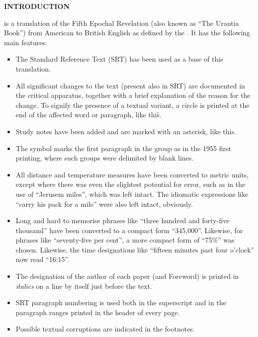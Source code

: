 \thispagestyle{empty}

\makeatletter
{}%
\makeatother

\begin{center}
\LARGE\bfseries
INTRODUCTION
\end{center}


 is a translation of the Fifth Epochal Revelation (also known as ``The Urantia Book'')
from American to British English as defined by the .
It has the following main features:

\begin{itemize}
\item The Standard Reference Text (SRT) has been used as a base of this translation.
\item All significant changes to the text (present also in SRT) are documented in the critical apparatus, together with a brief explanation of the reason for the change. To signify the presence of a textual variant, a circle is printed at the end of the affected word or paragraph, like this\r{}.
\item Study notes have been added and are marked with an asterisk, like this\ts{*}.
\item The symbol \pc{} marks the first paragraph in the group as in the 1955 first printing, where such groups were delimited by blank lines.
\item All distance and temperature measures have been converted to metric units, except where there was even the slightest potential for error, such as in the use of ``Jerusem miles'', which was left intact. The idiomatic expressions like ``carry his pack for a mile'' were also left intact, obviously.
\item Long and hard to memorise phrases like ``three hundred and forty\hyp{}five thousand'' have been converted to a compact form ``345,000''. Likewise, for phrases like ``seventy\hyp{}five per cent'', a more compact form of ``75\%'' was chosen. Likewise, the time designations like ``fifteen minutes past four o’clock'' now read ``16:15''.
\item The designation of the author of each paper (and Foreword) is printed in \textit{italics} on a line by itself just before the text.
\item SRT paragraph numbering is used both in the superscript and in the paragraph ranges printed in the header of every page.
\item Possible textual corruptions are indicated in the footnotes.
\end{itemize}

